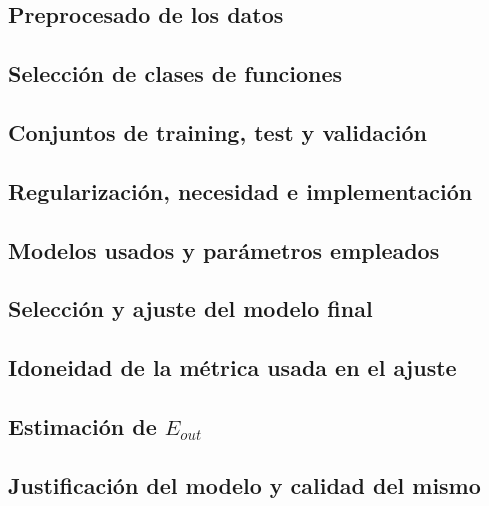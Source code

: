 \documentclass[12pt,a4paper]{article}
\begin{document}
\subsection{Preprocesado de los datos}

\subsection{Selección de clases de funciones}

\subsection{Conjuntos de training, test y validación}

\subsection{Regularización, necesidad e implementación}

\subsection{Modelos usados y parámetros empleados}

\subsection{Selección y ajuste del modelo final}

\subsection{Idoneidad de la métrica usada en el ajuste}

\subsection{Estimación de $E_{out}$}

\subsection{Justificación del modelo y calidad del mismo}
\end{document}
